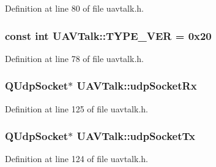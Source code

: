 \-Definition at line 80 of file uavtalk.\-h.

\hypertarget{group___u_a_v_talk_plugin_gad838c235ec5ef5e1389791d518faa6e7}{
\subsubsection[{\-T\-Y\-P\-E\-\_\-\-V\-E\-R}]{\setlength{\rightskip}{0pt plus 5cm}const int {\bf \-U\-A\-V\-Talk\-::\-T\-Y\-P\-E\-\_\-\-V\-E\-R} = 0x20}}\label{group___u_a_v_talk_plugin_gad838c235ec5ef5e1389791d518faa6e7}


\-Definition at line 78 of file uavtalk.\-h.

\hypertarget{group___u_a_v_talk_plugin_ga3fe3d99135440f58cb74fb73a4055ef4}{
\subsubsection[{udp\-Socket\-Rx}]{\setlength{\rightskip}{0pt plus 5cm}\-Q\-Udp\-Socket$\ast$ {\bf \-U\-A\-V\-Talk\-::udp\-Socket\-Rx}}}\label{group___u_a_v_talk_plugin_ga3fe3d99135440f58cb74fb73a4055ef4}


\-Definition at line 125 of file uavtalk.\-h.

\hypertarget{group___u_a_v_talk_plugin_ga02f40e7ac97a6778928a5e9869ea5bc8}{
\subsubsection[{udp\-Socket\-Tx}]{\setlength{\rightskip}{0pt plus 5cm}\-Q\-Udp\-Socket$\ast$ {\bf \-U\-A\-V\-Talk\-::udp\-Socket\-Tx}}}\label{group___u_a_v_talk_plugin_ga02f40e7ac97a6778928a5e9869ea5bc8}


\-Definition at line 124 of file uavtalk.\-h.

